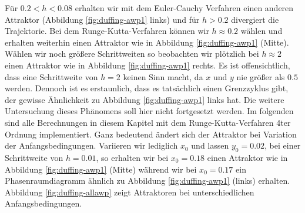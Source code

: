 \documentclass[11,5pt, twoside]{article}
\begin{document}
Für $0.2<h<0.08$ erhalten wir mit dem Euler-Cauchy Verfahren einen anderen Attraktor (Abbildung \ref{fig:duffing-awp1} links) und für $h>0.2$ divergiert die Trajektorie. Bei dem Runge-Kutta-Verfahren können wir $h \approx 0.2$ wählen und erhalten weiterhin einen Attraktor wie in Abbildung \ref{fig:duffing-awp1} (Mitte). Wählen wir noch größere Schrittweiten so beobachten wir plötzlich bei $h \approx 2$ einen Attraktor wie in Abbildung \ref{fig:duffing-awp1} rechts. Es ist offensichtlich, dass eine Schrittweite von $h=2$ keinen Sinn macht, da $x$ und $y$ nie größer als $0.5$ werden. Dennoch ist es erstaunlich, dass es tatsächlich einen Grenzzyklus gibt, der gewisse Ähnlichkeit zu Abbildung \ref{fig:duffing-awp1} links hat. Die weitere Untersuchung dieses Phänomens soll hier nicht fortgesetzt werden.
\newline
Im folgenden sind alle Berechnungen in diesem Kapitel mit dem Runge-Kutta-Verfahren 4ter Ordnung implementiert.
Ganz bedeutend ändert sich der Attraktor bei Variation der Anfangsbedingungen. Variieren wir lediglich $x_0$ und lassen $y_0=0.02$, bei einer Schrittweite von $h=0.01$, so erhalten wir bei $x_0=0.18$ einen Attraktor wie in  Abbildung \ref{fig:duffing-awp1} (Mitte) während wir bei $x_0=0.17$ ein Phasenraumdiagramm ähnlich zu Abbildung \ref{fig:duffing-awp1} (links) erhalten.
\newline
Abbildung \ref{fig:duffing-allawp} zeigt Attraktoren bei unterschiedlichen Anfangsbedingungen.
\end{document}
